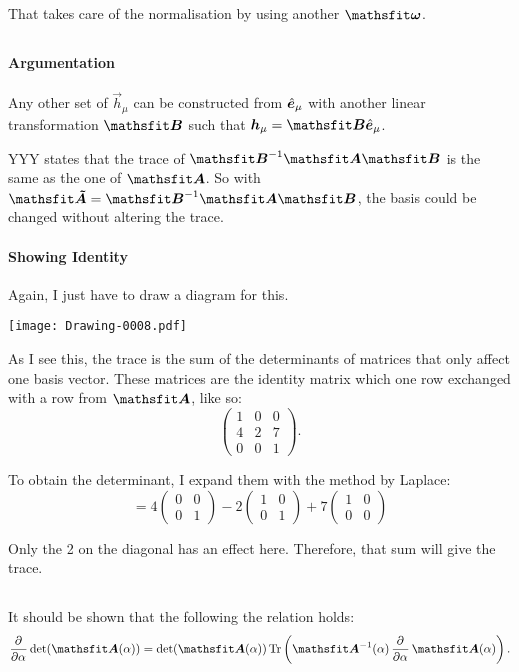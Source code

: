 That takes care of the normalisation by using another $\tens \omega$.

\subsection{}

\paragraph{Argumentation}

Any other set of $\vec h_\mu$ can be constructed from $\hat{\boldsymbol{e}}_\mu$ with another
linear transformation $\tens B$ such that $\vec h_\mu = \tens B \ev_\mu$.

YYY states that the trace of $\tens B^{-1} \tens A \tens B$ is the same as the
one of $\tens A$. So with $\tens{\tilde A} = \tens B^{-1} \tens A \tens B$, the
basis could be changed without altering the trace.

\paragraph{Showing Identity}

Again, I just have to draw a diagram for this.
\begin{center}
    \texttt{[image: Drawing-0008.pdf]}
\end{center}

As I see this, the trace is the sum of the determinants of matrices that only
affect one basis vector. These matrices are the identity matrix which one row
exchanged with a row from $\tens A$, like so:
\[
    \begin{pmatrix}
        1 & 0 & 0 \\
        4 & 2 & 7 \\
        0 & 0 & 1
    \end{pmatrix}.
\]

To obtain the determinant, I expand them with the method by Laplace:
\[
    = 4 \begin{pmatrix}
        0 & 0 \\ 0 & 1
    \end{pmatrix}
    - 2 \begin{pmatrix}
        1 & 0 \\ 0 & 1
    \end{pmatrix}
    + 7 \begin{pmatrix}
        1 & 0 \\ 0 & 0
    \end{pmatrix}
\]

Only the 2 on the diagonal has an effect here. Therefore, that sum will give
the trace.

\subsection{}

It should be shown that the following the relation holds:
\[
    \dpd{}\alpha \det(\tens A(\alpha)) = \det(\tens A(\alpha)) \Tr\del{\tens
    A^{-1}(\alpha) \dpd{}\alpha \tens A(\alpha)}.
\]

\IfFileExists{\bibliographyfile}{
    \printbibliography
}{}



